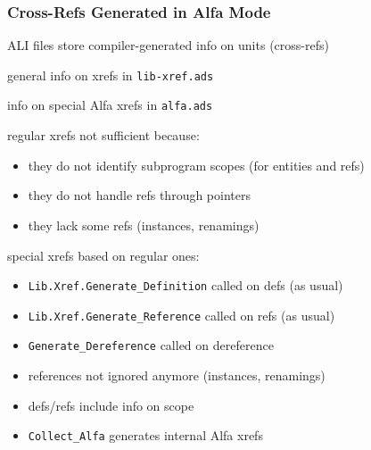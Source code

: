 \documentclass{beamer}
\newcommand{\vs}{\vspace{0.5cm}}
\newenvironment{specialframe}{%
  \begin{frame}[fragile,environment=specialframe]}{\end{frame}}
\begin{document}
\begin{specialframe}
  \frametitle{Cross-Refs Generated in Alfa Mode }

ALI files store compiler-generated info on units (cross-refs)

general info on xrefs in \verb|lib-xref.ads|

info on special Alfa xrefs in \verb|alfa.ads|

\vs

regular xrefs not sufficient because:
\begin{itemize}
\item they do not identify subprogram scopes (for entities and refs)
\item they do not handle refs through pointers
\item they lack some refs (instances, renamings)
\end{itemize}

\vs

special xrefs based on regular ones:
\begin{itemize}
\item \verb|Lib.Xref.Generate_Definition| called on defs (as usual)
\item \verb|Lib.Xref.Generate_Reference| called on refs (as usual)
\item \verb|Generate_Dereference| called on dereference
\item references not ignored anymore (instances, renamings)
\item defs/refs include info on scope
\item \verb|Collect_Alfa| generates internal Alfa xrefs
\end{itemize}

\end{specialframe}
\end{document}

